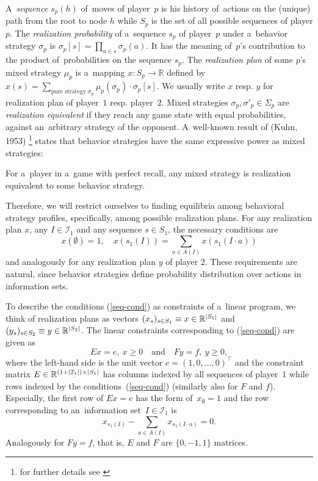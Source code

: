 A~\emph{sequence} $s_p(h)$ of~moves of player~$p$ is his history of~actions on the (unique) path from the root to node $h$ while $S_p$ is the set of all possible sequences of player $p$.
The \emph{realization probability} of a~sequence $s_p$ of player~$p$ under a~behavior strategy $\sigma _p$ is $\sigma _p [s] = \prod_{a \in s} \sigma _p(a)$.
It has the meaning of~$p$'s contribution to the product of~probabilities on the sequence $s_p$.
The \emph{realization plan} of some $p$'s mixed strategy $\mu_p$ is a~mapping $x\colon S_p \to \mathbb{R}$ defined by
$x(s) = \sum _{\textrm{pure strategy } \sigma _p} \mu _p (\sigma _p) \cdot \sigma _p [s]$.
We usually write $x$ resp. $y$ for realization plan of player~$1$ resp. player~$2$.
Mixed strategies $\sigma _p, \sigma' _p \in \Sigma _p$ are \emph{realization equivalent} if they reach any game state with equal probabilities, against an~arbitrary strategy of the opponent.
A~well-known result of (Kuhn, 1953)%
\footnote{for further details see \cite{AGT07}}
states that behavior strategies have the same expressive power as mixed strategies:
\begin{thm}
For a~player in a~game with perfect recall, any mixed strategy is realization equivalent to some behavior strategy.
\end{thm}
Therefore, we will restrict ourselves to finding equilibria among behavioral strategy profiles, specifically, among possible realization plans.
For any realization plan $x$, any $I \in \mathcal{I}_1$ and any sequence $s\in S_1$, the necessary conditions are
\begin{equation}
\label{seq-cond}
    x(\emptyset) = 1, \quad x(s_1(I)) = \sum _{a \in A(I)} x(s_1(I \cdot a))
\end{equation}
and analogously for any realization plan $y$ of player $2$.
These requirements are natural, since behavior strategies define probability distribution over actions in information sets.

To describe the conditions (\ref{seq-cond}) as constraints of a~linear program, we think of realization plans as vectors
$(x_s) _{s\in S_1} \equiv x \in \mathbb{R} ^{\left\vert S_1 \right\vert}$
and
$(y_s) _{s\in S_2} \equiv y \in \mathbb{R} ^{\left\vert S_2 \right\vert}$.
The linear constraints corresponding to (\ref{seq-cond}) are given as
\begin{equation}
\label{seq-constr}
    Ex = e, \ x \ge 0
    \quad \textrm{and} \quad
    Fy = f, \ y \ge 0,
\end{equation}
where the left-hand side is the unit vector $e = (1, 0, \dots, 0) ^\top$ and the constraint matrix
$E \in \mathbb{R} ^{(1 + \left\vert \mathcal{I}_1 \right\vert) \times \left\vert S_1 \right\vert}$
has columns indexed by all sequences of player~$1$ while rows indexed by the conditions~(\ref{seq-cond}) (similarly also for $F$ and $f$).
Especially, the first row of $Ex = e$ has the form of~$x _{\emptyset} = 1$ and the row corresponding to an~information set~$I \in \mathcal{I}_1$ is
\[
    x _{s_1 (I)} - \sum _{a \in A(I)} x _{s_1(I \cdot a)} = 0.
\]
Analogously for $Fy = f$, that is, $E$ and $F$ are $\{0, -1, 1\}$ matrices.

